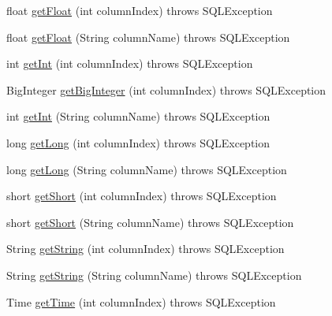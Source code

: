\begin{DoxyCompactItemize}
\item 
float \mbox{\hyperlink{classcom_1_1mysql_1_1cj_1_1jdbc_1_1result_1_1_result_set_impl_ad2bea9b787baf5a5c84d163882ea5d0c}{get\+Float}} (int column\+Index)  throws S\+Q\+L\+Exception 
\item 
float \mbox{\hyperlink{classcom_1_1mysql_1_1cj_1_1jdbc_1_1result_1_1_result_set_impl_a45744fc954365e6230491de74890c298}{get\+Float}} (String column\+Name)  throws S\+Q\+L\+Exception 
\item 
int \mbox{\hyperlink{classcom_1_1mysql_1_1cj_1_1jdbc_1_1result_1_1_result_set_impl_a91c6d60df79cf73466f59f65eeccfbd8}{get\+Int}} (int column\+Index)  throws S\+Q\+L\+Exception 
\item 
Big\+Integer \mbox{\hyperlink{classcom_1_1mysql_1_1cj_1_1jdbc_1_1result_1_1_result_set_impl_a6b0d6c2f2813b5e60fb67a9e4fd05104}{get\+Big\+Integer}} (int column\+Index)  throws S\+Q\+L\+Exception 
\item 
int \mbox{\hyperlink{classcom_1_1mysql_1_1cj_1_1jdbc_1_1result_1_1_result_set_impl_a8db6a81593e4e77b99ba5f1f9f5874b8}{get\+Int}} (String column\+Name)  throws S\+Q\+L\+Exception 
\item 
long \mbox{\hyperlink{classcom_1_1mysql_1_1cj_1_1jdbc_1_1result_1_1_result_set_impl_a1b24c57482dc4d8cfdfbc40bad8131b5}{get\+Long}} (int column\+Index)  throws S\+Q\+L\+Exception 
\item 
long \mbox{\hyperlink{classcom_1_1mysql_1_1cj_1_1jdbc_1_1result_1_1_result_set_impl_a5a7d33017f2f84f834d795720146defd}{get\+Long}} (String column\+Name)  throws S\+Q\+L\+Exception 
\item 
short \mbox{\hyperlink{classcom_1_1mysql_1_1cj_1_1jdbc_1_1result_1_1_result_set_impl_ae78f552890ac6771c0e175468d3298dc}{get\+Short}} (int column\+Index)  throws S\+Q\+L\+Exception 
\item 
short \mbox{\hyperlink{classcom_1_1mysql_1_1cj_1_1jdbc_1_1result_1_1_result_set_impl_a4eabc477bb80c7154c03bf6939803085}{get\+Short}} (String column\+Name)  throws S\+Q\+L\+Exception 
\item 
String \mbox{\hyperlink{classcom_1_1mysql_1_1cj_1_1jdbc_1_1result_1_1_result_set_impl_aaefab0cdda2cc71f82dc7c353c5e7da6}{get\+String}} (int column\+Index)  throws S\+Q\+L\+Exception 
\item 
String \mbox{\hyperlink{classcom_1_1mysql_1_1cj_1_1jdbc_1_1result_1_1_result_set_impl_ac68df9a9e90ef3b2399de81aa98ea23b}{get\+String}} (String column\+Name)  throws S\+Q\+L\+Exception 
\item 
Time \mbox{\hyperlink{classcom_1_1mysql_1_1cj_1_1jdbc_1_1result_1_1_result_set_impl_a70f45ac7de4fdc129a5376b618cf1ee2}{get\+Time}} (int column\+Index)  throws S\+Q\+L\+Exception 

\end{DoxyCompactItemize}
